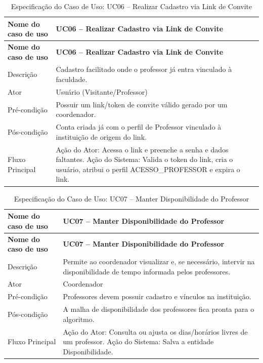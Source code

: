 \fonteautores

\vspace{\baselineskip}

\Needspace{0.48\textheight}
\begin{longtable}{|L{4.5cm}|L{10.5cm}|}
\caption{Especificação do Caso de Uso: UC06 -- Realizar Cadastro via Link de Convite} \\
\hline
\textbf{Nome do caso de uso} & \textbf{UC06 -- Realizar Cadastro via Link de Convite} \\
\hline
\endfirsthead
\hline
\textbf{Nome do caso de uso} & \textbf{UC06 -- Realizar Cadastro via Link de Convite} \\
\hline
\endhead
Descrição       & Cadastro facilitado onde o professor já entra vinculado à faculdade. \\
\hline
Ator            & Usuário (Visitante/Professor) \\
\hline
Pré-condição    & Possuir um link/token de convite válido gerado por um coordenador. \\
\hline
Pós-condição    & Conta criada já com o perfil de Professor vinculado à instituição de origem do link. \\
\hline
Fluxo Principal & Ação do Ator: Acessa o link e preenche a senha e dados faltantes. Ação do Sistema: Valida o token do link, cria o usuário, atribui o perfil ACESSO\_PROFESSOR e expira o link. \\
\hline
\end{longtable}

\fonteautores

\vspace{\baselineskip}

\Needspace{0.48\textheight}
\begin{longtable}{|L{4.5cm}|L{10.5cm}|}
\caption{Especificação do Caso de Uso: UC07 -- Manter Disponibilidade do Professor} \\
\hline
\textbf{Nome do caso de uso} & \textbf{UC07 -- Manter Disponibilidade do Professor} \\
\hline
\endfirsthead
\hline
\textbf{Nome do caso de uso} & \textbf{UC07 -- Manter Disponibilidade do Professor} \\
\hline
\endhead
Descrição       & Permite ao coordenador visualizar e, se necessário, intervir na disponibilidade de tempo informada pelos professores. \\
\hline
Ator            & Coordenador \\
\hline
Pré-condição    & Professores devem possuir cadastro e vínculos na instituição. \\
\hline
Pós-condição    & A malha de disponibilidade dos professores fica pronta para o algoritmo. \\
\hline
Fluxo Principal & Ação do Ator: Consulta ou ajusta os dias/horários livres de um professor. Ação do Sistema: Salva a entidade Disponibilidade. \\
\hline
\end{longtable}

